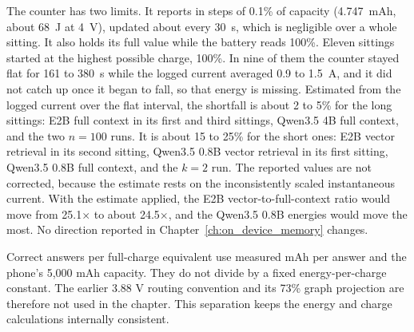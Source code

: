 The counter has two limits. It reports in steps of 0.1\% of capacity (4.747~mAh, about 68~J at
4~V), updated about every 30~s, which is negligible over a whole sitting. It also holds its full
value while the battery reads 100\%. Eleven sittings started at the highest possible charge,
100\%. In nine of them the counter stayed flat for 161 to 380~s while
the logged current averaged 0.9 to 1.5~A, and it did not catch up once it began to fall, so that
energy is missing.
Estimated from the logged current over the flat interval, the shortfall is about 2 to 5\% for the
long sittings: E2B full context in its first and third sittings, Qwen3.5 4B full context, and the two
$n=100$ runs. It is about 15 to 25\% for the short ones: E2B vector retrieval in its second sitting,
Qwen3.5 0.8B vector retrieval in its first sitting, Qwen3.5 0.8B full context, and the $k=2$ run. The
reported values are not corrected, because the estimate rests on the inconsistently scaled
instantaneous current. With the estimate applied, the E2B vector-to-full-context ratio would move
from 25.1$\times$ to about 24.5$\times$, and the Qwen3.5 0.8B energies would move the most. No
direction reported in Chapter~\ref{ch:on_device_memory} changes.

Correct answers per full-charge equivalent use measured mAh per answer and the phone's
5,000 mAh capacity. They do not divide by a fixed energy-per-charge constant. The earlier
3.88 V routing convention and its 73\% graph projection are therefore not used in the
chapter. This separation keeps the energy and charge calculations internally consistent.
